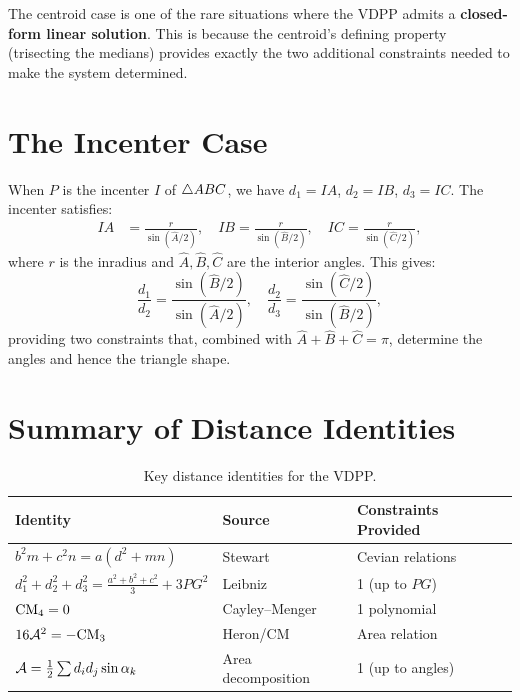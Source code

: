 \begin{remark}
The centroid case is one of the rare situations where the VDPP admits a \textbf{closed-form linear solution}. This is because the centroid's defining property (trisecting the medians) provides exactly the two additional constraints needed to make the system determined.
\end{remark}

\section{The Incenter Case}

When $P$ is the incenter $I$ of $\triangle ABC$, we have $d_1 = IA$, $d_2 = IB$, $d_3 = IC$. The incenter satisfies:
\begin{align}
IA &= \frac{r}{\sin(\hat{A}/2)}, \quad
IB = \frac{r}{\sin(\hat{B}/2)}, \quad
IC = \frac{r}{\sin(\hat{C}/2)},
\end{align}
where $r$ is the inradius and $\hat{A}, \hat{B}, \hat{C}$ are the interior angles. This gives:
\begin{equation}
\frac{d_1}{d_2} = \frac{\sin(\hat{B}/2)}{\sin(\hat{A}/2)}, \quad \frac{d_2}{d_3} = \frac{\sin(\hat{C}/2)}{\sin(\hat{B}/2)},
\end{equation}
providing two constraints that, combined with $\hat{A} + \hat{B} + \hat{C} = \pi$, determine the angles and hence the triangle shape.

\section{Summary of Distance Identities}

\begin{table}[h!]
\centering
\caption{Key distance identities for the VDPP.}
\label{tab:distance-identities}
\begin{tabular}{lll}
\toprule
\textbf{Identity} & \textbf{Source} & \textbf{Constraints Provided} \\
\midrule
$b^2 m + c^2 n = a(d^2 + mn)$ & Stewart & Cevian relations \\
$d_1^2 + d_2^2 + d_3^2 = \frac{a^2+b^2+c^2}{3} + 3PG^2$ & Leibniz & 1 (up to $PG$) \\
$\mathrm{CM}_4 = 0$ & Cayley--Menger & 1 polynomial \\
$16\mathcal{A}^2 = -\mathrm{CM}_3$ & Heron/CM & Area relation \\
$\mathcal{A} = \frac{1}{2}\sum d_i d_j \sin\alpha_k$ & Area decomposition & 1 (up to angles) \\
\bottomrule
\end{tabular}
\end{table}
